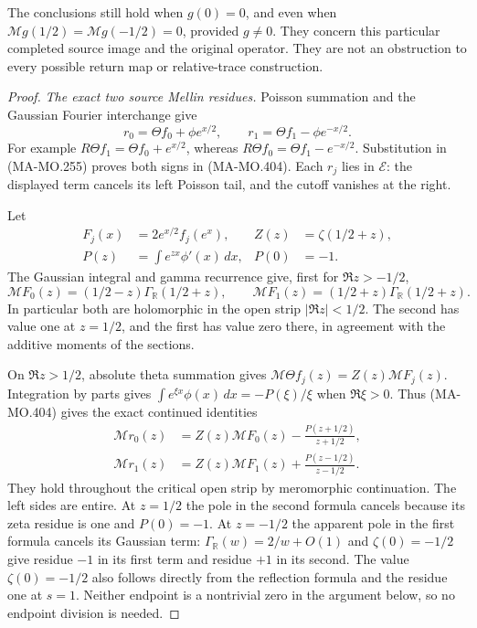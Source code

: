 The conclusions still hold when \(g(0)=0\), and even when
\(\mathcal Mg(1/2)=\mathcal Mg(-1/2)=0\), provided
\(g\ne0\). They concern this particular completed source
image and the original operator. They are not an obstruction
to every possible return map or relative-trace construction.

\begin{proof}
\emph{The exact two source Mellin residues.}
Poisson summation and the Gaussian Fourier interchange give
\[
       r_0=\Theta f_0+\phi e^{x/2},\qquad
       r_1=\Theta f_1-\phi e^{-x/2}.
 \tag{MA-MO.404}
\]
For example \(R\Theta f_1=\Theta f_0+e^{x/2}\),
whereas \(R\Theta f_0=\Theta f_1-e^{-x/2}\).
Substitution in (MA-MO.255) proves both signs in
(MA-MO.404). Each \(r_j\) lies in \(\mathcal E\):
the displayed term cancels its left Poisson tail, and the
cutoff vanishes at the right.

Let
\[
 \begin{aligned}
 F_j(x)&=2e^{x/2}f_j(e^x),&Z(z)&=\zeta(1/2+z),\\
 P(z)&=\int e^{zx}\phi'(x)\,dx,&P(0)&=-1.
 \end{aligned}
 \tag{MA-MO.405}
\]
The Gaussian integral and gamma recurrence give, first for
\(\Re z>-1/2\),
\[
 \mathcal MF_0(z)=(1/2-z)\Gamma_{\mathbb R}(1/2+z),
 \qquad
 \mathcal MF_1(z)=(1/2+z)\Gamma_{\mathbb R}(1/2+z).
 \tag{MA-MO.406}
\]
In particular both are holomorphic in the open strip
\(|\Re z|<1/2\). The second has value one at \(z=1/2\),
and the first has value zero there, in agreement with the
additive moments of the sections.

On \(\Re z>1/2\), absolute theta summation gives
\(\mathcal M\Theta f_j(z)=Z(z)\mathcal MF_j(z)\).
Integration by parts gives
\(\int e^{\xi x}\phi(x)\,dx=-P(\xi)/\xi\)
when \(\Re\xi>0\). Thus (MA-MO.404) gives the exact
continued identities
\[
 \begin{aligned}
 \mathcal Mr_0(z)
     &=Z(z)\mathcal MF_0(z)-\frac{P(z+1/2)}{z+1/2},\\
 \mathcal Mr_1(z)
     &=Z(z)\mathcal MF_1(z)+\frac{P(z-1/2)}{z-1/2}.
 \end{aligned}
 \tag{MA-MO.407}
\]
They hold throughout the critical open strip by meromorphic
continuation. The left sides are entire. At \(z=1/2\)
the pole in the second formula cancels because its zeta
residue is one and \(P(0)=-1\). At \(z=-1/2\) the
apparent pole in the first formula cancels its Gaussian
term: \(\Gamma_{\mathbb R}(w)=2/w+O(1)\) and
\(\zeta(0)=-1/2\) give residue \(-1\) in its first
term and residue \(+1\) in its second. The value
\(\zeta(0)=-1/2\) also follows directly from the reflection
formula and the residue one at \(s=1\). Neither endpoint
is a nontrivial zero in the argument
below, so no endpoint division is needed.


\end{proof}
